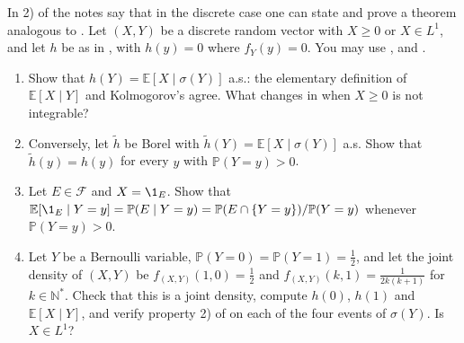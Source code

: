 
\begin{exercise}\label{ex:ce-discrete-case}
\easy In 2) of  the notes say that in the discrete case one can
state and prove a theorem analogous to . Let $(X,Y)$ be a discrete
random vector with $X\ge0$ or $X\in L^1$, and let $h$ be as in , with
$h(y)=0$ where $f_Y(y)=0$. You may use ,
 and .
\begin{enumerate}[label=(\alph*)]
  \item Show that $h(Y)=\mathbb E[X\mid\sigma(Y)]$ a.s.: the elementary definition of
    $\mathbb E[X\mid Y]$ and Kolmogorov's agree. What changes in
     when $X\ge0$ is not integrable?
  \item Conversely, let $\tilde h$ be Borel with $\tilde h(Y)=\mathbb E[X\mid\sigma(Y)]$ a.s.
    Show that $\tilde h(y)=h(y)$ for every $y$ with $\mathbb P(Y=y)>0$.
  \item Let $E\in\mathcal F$ and $X=\1_E$. Show that
    $\mathbb E[\1_E\mid Y=y]=\mathbb P(E\mid Y=y)=\mathbb P(E\cap\{Y=y\})/\mathbb P(Y=y)$ whenever
    $\mathbb P(Y=y)>0$.
  \item Let $Y$ be a Bernoulli variable, $\mathbb P(Y=0)=\mathbb P(Y=1)=\frac12$, and let the joint
    density of $(X,Y)$ be $f_{(X,Y)}(1,0)=\frac12$ and
    $f_{(X,Y)}(k,1)=\frac1{2k(k+1)}$ for $k\in\mathbb N^*$. Check that this is a joint density,
    compute $h(0)$, $h(1)$ and $\mathbb E[X\mid Y]$, and verify property 2) of
     on each of the four events of $\sigma(Y)$. Is
    $X\in L^1$?
\end{enumerate}
\end{exercise}

